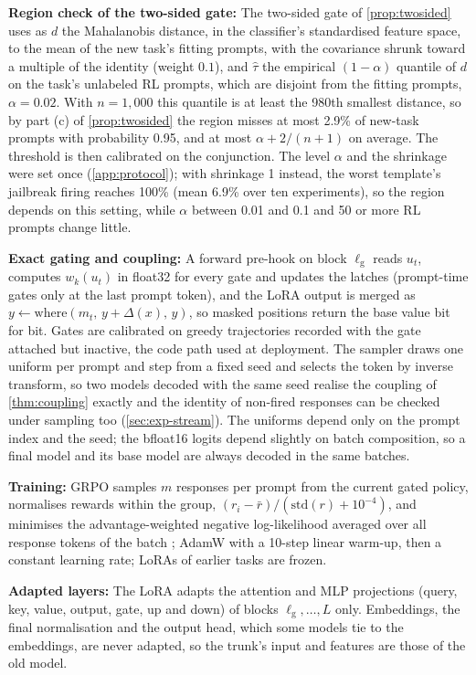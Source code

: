 \documentclass{article}
\theoremstyle{plain}
\theoremstyle{definition}
\theoremstyle{remark}
\renewcommand{\lg}{\ell_{\mathrm{g}}}
\begin{document}
\textbf{Region check of the two-sided gate:} The two-sided gate of \cref{prop:twosided} uses as $d$ the Mahalanobis distance, in the
classifier's standardised feature space, to the mean of the new task's fitting prompts, with the covariance shrunk toward
a multiple of the identity (weight $0.1$), and $\hat\tau$ the empirical $(1-\alpha)$ quantile of $d$ on the task's unlabeled
RL prompts, which are disjoint from the fitting prompts, $\alpha=0.02$. With $n=1{,}000$ this quantile is at least the
980th smallest distance, so by part (c) of \cref{prop:twosided} the region misses at most 2.9\% of new-task prompts with
probability 0.95, and at most $\alpha+2/(n+1)$ on average. The threshold is then calibrated on the conjunction. The level $\alpha$ and
the shrinkage were set once (\cref{app:protocol}); with shrinkage 1 instead, the worst template's jailbreak firing
reaches 100\% (mean 6.9\% over ten experiments), so the region depends on this setting, while $\alpha$ between 0.01 and
0.1 and 50 or more RL prompts change little.

\textbf{Exact gating and coupling:} A forward pre-hook on block $\lg$ reads $u_t$, computes $w_k(u_t)$ in float32
for every gate and updates the latches (prompt-time gates only at the last prompt token), and the LoRA output is
merged as $y\leftarrow\mathrm{where}(m_t,\,y+\Delta(x),\,y)$, so masked positions return the base value bit for bit.
Gates are calibrated on greedy trajectories recorded with the gate attached but inactive, the code path used at
deployment. The sampler draws one uniform per prompt and step from a fixed seed and selects the token by inverse
transform, so two models decoded with the same seed realise the coupling of \cref{thm:coupling} exactly and the
identity of non-fired responses can be checked under sampling too (\cref{sec:exp-stream}). The uniforms depend only
on the prompt index and the seed; the bfloat16 logits depend slightly on batch composition, so a final model and its
base model are always decoded in the same batches.

\textbf{Training:} GRPO \citep{shao2024deepseekmath} samples $m$ responses per prompt from the current gated policy,
normalises rewards within the group, $(r_i-\bar r)/(\mathrm{std}(r)+10^{-4})$, and minimises the advantage-weighted
negative log-likelihood averaged over all response tokens of the batch \citep{yu2025dapo}; AdamW with a 10-step linear
warm-up, then a constant learning rate; LoRAs of earlier tasks are frozen.

\textbf{Adapted layers:} The LoRA adapts the attention and MLP projections (query, key, value, output,
gate, up and down) of blocks $\lg,\dots,L$ only. Embeddings, the final normalisation and the output head, which some
models tie to the embeddings, are never adapted, so the trunk's input and features are those of the old model.
\end{document}
